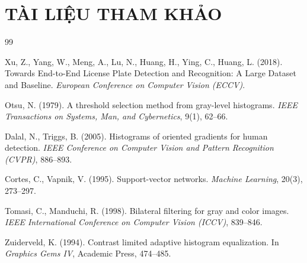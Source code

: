 \documentclass[13pt, a4paper, oneside]{extbook}
\numberwithin{subsection}{section}
\theoremstyle{plain}
\theoremstyle{definition}
\theoremstyle{remark}
\begin{document}
\chapter*{TÀI LIỆU THAM KHẢO}
\begin{thebibliography}{99}

Xu, Z., Yang, W., Meng, A., Lu, N., Huang, H., Ying, C., Huang, L. (2018). Towards End-to-End License Plate Detection and Recognition: A Large Dataset and Baseline. \textit{European Conference on Computer Vision (ECCV)}.

Otsu, N. (1979). A threshold selection method from gray-level histograms. \textit{IEEE Transactions on Systems, Man, and Cybernetics}, 9(1), 62--66.

Dalal, N., Triggs, B. (2005). Histograms of oriented gradients for human detection. \textit{IEEE Conference on Computer Vision and Pattern Recognition (CVPR)}, 886--893.

Cortes, C., Vapnik, V. (1995). Support-vector networks. \textit{Machine Learning}, 20(3), 273--297.

Tomasi, C., Manduchi, R. (1998). Bilateral filtering for gray and color images. \textit{IEEE International Conference on Computer Vision (ICCV)}, 839--846.

Zuiderveld, K. (1994). Contrast limited adaptive histogram equalization. In \textit{Graphics Gems IV}, Academic Press, 474--485.
\end{thebibliography}
\end{document}
